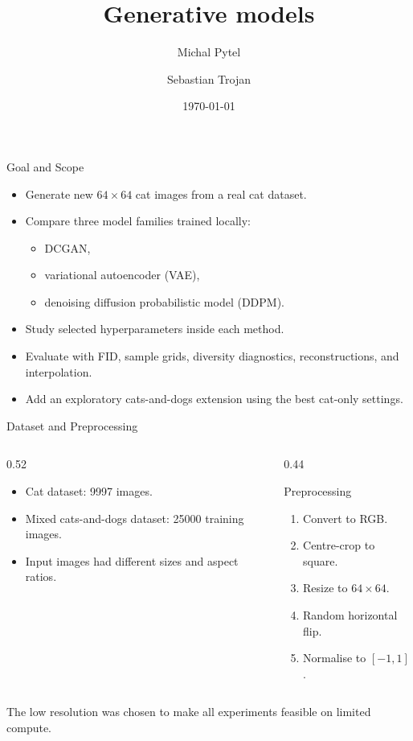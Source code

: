 \documentclass[aspectratio=169]{beamer}
\title[Generative models]{Generative models}
\author{Michal Pytel \and Sebastian Trojan}
\date{\today}
\begin{document}
\begin{frame}
  \titlepage
\end{frame}

\begin{frame}{Goal and Scope}
  \begin{itemize}
    \item Generate new $64\times64$ cat images from a real cat dataset.
    \item Compare three model families trained locally:
      \begin{itemize}
        \item DCGAN,
        \item variational autoencoder (VAE),
        \item denoising diffusion probabilistic model (DDPM).
      \end{itemize}
    \item Study selected hyperparameters inside each method.
    \item Evaluate with FID, sample grids, diversity diagnostics, reconstructions, and interpolation.
    \item Add an exploratory cats-and-dogs extension using the best cat-only settings.
  \end{itemize}
\end{frame}

\begin{frame}{Dataset and Preprocessing}
  \begin{columns}[T]
    \begin{column}{0.52\linewidth}
      \begin{itemize}
        \item Cat dataset: 9997 images.
        \item Mixed cats-and-dogs dataset: 25000 training images.
        \item Input images had different sizes and aspect ratios.
      \end{itemize}
    \end{column}
    \begin{column}{0.44\linewidth}
      \begin{block}{Preprocessing}
        \begin{enumerate}
          \item Convert to RGB.
          \item Centre-crop to square.
          \item Resize to $64\times64$.
          \item Random horizontal flip.
          \item Normalise to $[-1,1]$.
        \end{enumerate}
      \end{block}
    \end{column}
  \end{columns}
  \vspace{0.25cm}
  \centering
  \small
  The low resolution was chosen to make all experiments feasible on limited compute.
\end{frame}
\end{document}
